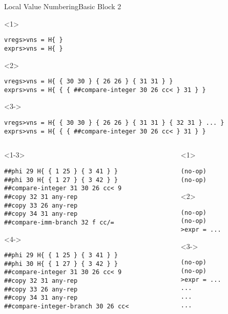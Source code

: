 \documentclass{beamer}
\begin{document}
\begin{frame}[fragile]{Local Value Numbering}{Basic Block 2}
  \begin{onlyenv}<1>
  \begin{Verbatim}
vregs>vns = H{ }
exprs>vns = H{ }
  \end{Verbatim}
  \end{onlyenv}
  \begin{onlyenv}<2>
  \begin{Verbatim}
vregs>vns = H{ { 30 30 } { 26 26 } { 31 31 } }
exprs>vns = H{ { { ##compare-integer 30 26 cc< } 31 } }
  \end{Verbatim}
  \end{onlyenv}
  \begin{onlyenv}<3->
  \begin{Verbatim}
vregs>vns = H{ { 30 30 } { 26 26 } { 31 31 } { 32 31 } ... }
exprs>vns = H{ { { ##compare-integer 30 26 cc< } 31 } }
  \end{Verbatim}
  \end{onlyenv}
  \begin{columns}[t,onlytextwidth]
    \begin{column}[t]{.6\textwidth}
      \begin{onlyenv}<1-3>
      \begin{Verbatim}[frame=single]
##phi 29 H{ { 1 25 } { 3 41 } }
##phi 30 H{ { 1 27 } { 3 42 } }
##compare-integer 31 30 26 cc< 9
##copy 32 31 any-rep
##copy 33 26 any-rep
##copy 34 31 any-rep
##compare-imm-branch 32 f cc/=
      \end{Verbatim}
      \end{onlyenv}
      \begin{onlyenv}<4->
      \begin{Verbatim}[frame=single]
##phi 29 H{ { 1 25 } { 3 41 } }
##phi 30 H{ { 1 27 } { 3 42 } }
##compare-integer 31 30 26 cc< 9
##copy 32 31 any-rep
##copy 33 26 any-rep
##copy 34 31 any-rep
##compare-integer-branch 30 26 cc<
      \end{Verbatim}
      \end{onlyenv}
    \end{column}

    \begin{column}[t]{.3\textwidth}
      \begin{onlyenv}<1>
        \begin{Verbatim}
(no-op)
(no-op)
        \end{Verbatim}
      \end{onlyenv}
      \begin{onlyenv}<2>
        \begin{Verbatim}
(no-op)
(no-op)
>expr = ...
        \end{Verbatim}
      \end{onlyenv}
      \begin{onlyenv}<3->
        \begin{Verbatim}
(no-op)
(no-op)
>expr = ...
...
...
...
        \end{Verbatim}
      \end{onlyenv}
    \end{column}
  \end{columns}
\end{frame}
\end{document}
